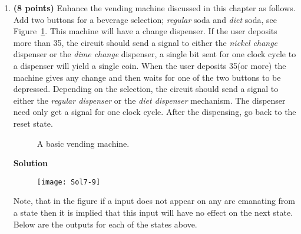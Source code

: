 \begin{enumerate}
\begin{onlysolution}
{                The cost of this solution is 6*8 + 6 + 2 + 9 + 6 + 6 + 9 + 6 + 2 + 5 = 48 + 51 = 99
            }
        \end{onlysolution}

    \item \textbf{ (8 points)}
        Enhance the vending machine discussed in this chapter as follows.
        Add two buttons for a beverage selection; \textit{ regular} soda and \textit{ diet}
        soda, see Figure~\ref{fig:Vend}.  This machine will have a change dispenser.
        If the user deposits more than 35\textcent, the circuit should send a signal to
        either the \textit{ nickel change} dispenser or the \textit{ dime change} dispenser,
        a single bit sent for one clock cycle to a dispenser will yield a single coin.
        When the user deposits 35\textcent (or more) the machine gives any change and
        then waits for one of the two buttons to be depressed.  Depending on the
        selection, the circuit should send a signal to either the
        \textit{ regular dispenser} or
        the \textit{ diet dispenser} mechanism.  The dispenser need only get a signal for
        one clock cycle.  After the dispensing, go back to the reset state.
        \begin{figure}[ht]
            \caption{A basic vending machine.}
            \label{fig:Vend}
        \end{figure}\vspace{-1em}
        \begin{onlysolution}  \textbf{Solution} \itshape{
                \begin{figure}[ht]
                    \texttt{[image: Sol7-9]}
                \end{figure}

                Note, that in the figure if a input does not appear on
                any arc emanating from a state then it is implied that
                this input will have no effect on the next state.  Below
                are the outputs for each of the states above.

}
\end{onlysolution}
\end{enumerate}
